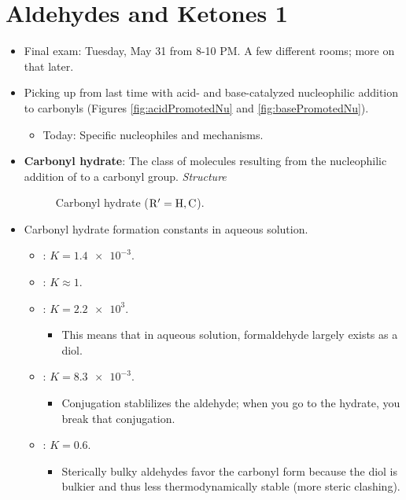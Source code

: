 \documentclass[../notes.tex]{subfiles}
\begin{document}
\section{Aldehydes and Ketones 1}
\begin{itemize}
    \item {}Final exam: Tuesday, May 31 from 8-10 PM. A few different rooms; more on that later.
    \item Picking up from last time with acid- and base-catalyzed nucleophilic addition to carbonyls (Figures \ref{fig:acidPromotedNu} and \ref{fig:basePromotedNu}).
    \begin{itemize}
        \item Today: Specific nucleophiles and mechanisms.
    \end{itemize}
    \item \textbf{Carbonyl hydrate}: The class of molecules resulting from the nucleophilic addition of  to a carbonyl group. \emph{Structure}
    \begin{figure}[h!]
        \centering
        \footnotesize
        \caption{Carbonyl hydrate ($\ce{R$'$}=\ce{H},\ce{C}$).}
        \label{fig:carbonylHydrate}
    \end{figure}
    \item Carbonyl hydrate formation constants in aqueous solution.
    \begin{itemize}
        \item {}: $K=\num{1.4e-3}$.
        \item {}: $K\approx 1$.
        \item {}: $K=\num{2.2e3}$.
        \begin{itemize}
            \item This means that in aqueous solution, formaldehyde largely exists as a diol.
        \end{itemize}
        \item {}: $K=\num{8.3e-3}$.
        \begin{itemize}
            \item Conjugation stablilizes the aldehyde; when you go to the hydrate, you break that conjugation.
        \end{itemize}
        \item {}: $K=0.6$.
        \begin{itemize}
            \item Sterically bulky aldehydes favor the carbonyl form because the diol is bulkier and thus less thermodynamically stable (more steric clashing).

\end{itemize}
\end{itemize}
\end{itemize}
\end{document}
